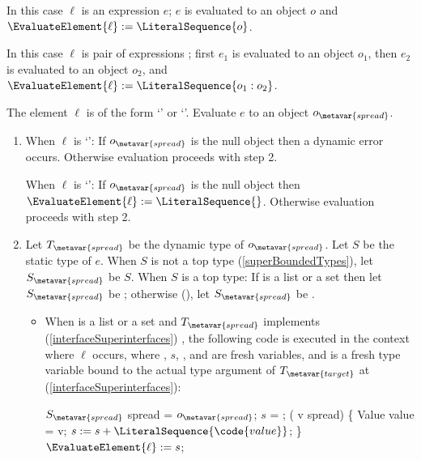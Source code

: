 \documentclass[makeidx]{article}
\begin{document}
{\LMHash{}%
In this case $\ell$ is an expression $e$;
$e$ is evaluated to an object $o$
and $\EvaluateElement{\ell} := \LiteralSequence{o}$.
\EndCase

\LMHash{}%
In this case $\ell$ is pair of expressions
;
first $e_1$ is evaluated to an object $o_1$,
then $e_2$ is evaluated to an object $o_2$,
and $\EvaluateElement{\ell} := \LiteralSequence{o_1:o_2}$.
\EndCase

\LMHash{}%
The element $\ell$ is of the form `' or `'.
Evaluate $e$ to an object $o_{\metavar{spread}}$.
\begin{enumerate}
\item
  When $\ell$ is `':
  If $o_{\metavar{spread}}$ is the null object then a dynamic error occurs.
  Otherwise evaluation proceeds with step 2.

  When $\ell$ is `':
  If $o_{\metavar{spread}}$ is the null object then
  $\EvaluateElement{\ell} := \LiteralSequence{}$.
  Otherwise evaluation proceeds with step 2.
\item
  Let $T_{\metavar{spread}}$ be the dynamic type of $o_{\metavar{spread}}$.
  Let $S$ be the static type of $e$.
  When $S$ is not a top type
  (\ref{superBoundedTypes}),
  let $S_{\metavar{spread}}$ be $S$.
  When $S$ is a top type:
  If  is a list or a set then
  let $S_{\metavar{spread}}$ be ;
  otherwise
  (),
  let $S_{\metavar{spread}}$ be .

  \begin{itemize}
  \item
    When  is a list or a set and $T_{\metavar{spread}}$ implements
    (\ref{interfaceSuperinterfaces})
    ,
    the following code is executed in the context where $\ell$ occurs,
    where , $s$, , and  are fresh variables,
    and  is a fresh type variable bound to the
    actual type argument of $T_{\metavar{target}}$ at 
    (\ref{interfaceSuperinterfaces}):

    \vspace{-2ex}\begin{minipage}[t]{\textwidth}
\begin{normativeDartCode}
$S_{\metavar{spread}}$ spread = $o_{\metavar{spread}}$;
\VAR{} $s$ = \LiteralSequence{};
\FOR{} (\VAR{} v \IN{} spread) \{
  Value value = v;
  $s := s + \LiteralSequence{\code{value}}$;
\}
$\EvaluateElement{\ell} := s$;
\end{normativeDartCode}
    \end{minipage}


\end{itemize}
\end{enumerate}}
\end{document}
